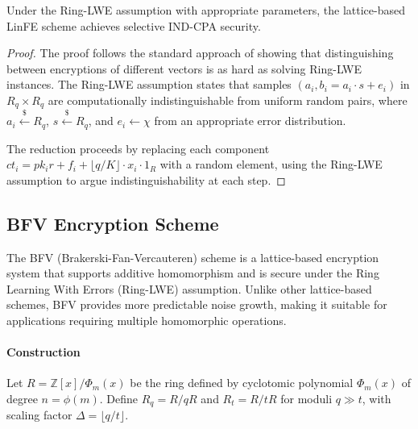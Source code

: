 \begin{theorem}
Under the Ring-LWE assumption with appropriate parameters, the lattice-based LinFE scheme achieves selective IND-CPA security.
\end{theorem}

\begin{proof}
The proof follows the standard approach of showing that distinguishing between encryptions of different vectors is as hard as solving Ring-LWE instances. The Ring-LWE assumption states that samples $(a_i, b_i = a_i \cdot s + e_i)$ in $R_q \times R_q$ are computationally indistinguishable from uniform random pairs, where $a_i \stackrel{\$}{\leftarrow} R_q$, $s \stackrel{\$}{\leftarrow} R_q$, and $e_i \leftarrow \chi$ from an appropriate error distribution.

The reduction proceeds by replacing each component $ct_i = pk_i r + f_i + \lfloor q/K \rfloor \cdot x_i \cdot 1_R$ with a random element, using the Ring-LWE assumption to argue indistinguishability at each step.
\end{proof}

\subsection{BFV Encryption Scheme}\label{Appendix:BFV}

The BFV (Brakerski-Fan-Vercauteren) scheme is a lattice-based encryption system that supports additive homomorphism and is secure under the Ring Learning With Errors (Ring-LWE) assumption. Unlike other lattice-based schemes, BFV provides more predictable noise growth, making it suitable for applications requiring multiple homomorphic operations.

\paragraph{Construction}
Let $R = \mathbb{Z}[x]/\Phi_m(x)$ be the ring defined by cyclotomic polynomial $\Phi_m(x)$ of degree $n = \phi(m)$. Define $R_q = R/qR$ and $R_t = R/tR$ for moduli $q \gg t$, with scaling factor $\Delta = \lfloor q/t \rfloor$.

